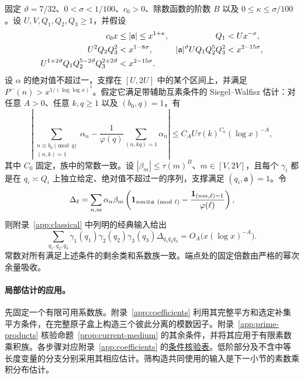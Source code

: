 \begin{proposition}[受限中等长度卷积]
\label{prop:current-medium}
固定 $\vartheta=7/32$、$0<\sigma<1/100$、$c_0>0$、除数函数的阶数 $B$ 以及 $0\le\kappa\le\sigma/100$。设 $U,V,Q_1,Q_2,Q_3\ge1$，并假设
\begin{align}
 c_0x&\le |\mathfrak a|\le x^{1+\kappa},&
 Q_1&<Ux^{-\sigma}, \notag\\
 U^2Q_2Q_3^2&<x^{1-8\sigma},&
 |\mathfrak a|^{\vartheta}UQ_1Q_2^5Q_3^2&<x^{2-15\sigma},
       \label{eq:current-medium-ranges}\\
 U^{1+2\vartheta}Q_1Q_2^{5-2\vartheta}Q_3^{2+2\vartheta}
      &<x^{2-15\sigma}.&&\notag
\end{align}
设 $\alpha$ 的绝对值不超过一，支撑在 $[U,2U]$ 中的某个区间上，并满足 $P^-(n)>x^{1/(\log\log x)^3}$。假定它满足带辅助互素条件的 Siegel--Walfisz 估计：对任意 $A>0$、任意 $k,q\ge1$ 以及 $(b_0,q)=1$，有
\begin{equation}
 \left|\sum_{\substack{n\equiv b_0\pmod q\\(n,k)=1}}\alpha_n
 -\frac1{\varphi(q)}\sum_{(n,kq)=1}\alpha_n\right|
 \le C_AU\tau(k)^{C_0}(\log x)^{-A},
 \label{eq:current-aux-sw}
\end{equation}
其中 $C_0$ 固定，族中的常数一致。设 $|\beta_m|\le\tau(m)^B$、$m\in[V,2V]$，且每个 $\gamma_i$ 都是在 $q_i\asymp Q_i$ 上独立给定、绝对值不超过一的序列，支撑满足 $(q_i,\mathfrak a)=1$。令
\[
 \Delta_{\ell}=\sum_{n,m}\alpha_n\beta_m
 \left({\mathbf 1}_{nm\equiv\mathfrak a\pmod \ell}
       -\frac{{\mathbf 1}_{(nm,\ell)=1}}{\varphi(\ell)}\right),
\]
则附录~\ref{app:classical} 中列明的经典输入给出
\begin{equation}
 \sum_{q_1,q_2,q_3}\gamma_1(q_1)\gamma_2(q_2)\gamma_3(q_3)
                    \Delta_{q_1q_2q_3}
       =O_A\bigl(x(\log x)^{-A}\bigr).
 \label{eq:current-medium-conclusion}
\end{equation}
常数对所有满足上述条件的剩余类和系数族一致。端点处的固定倍数由严格的幂次余量吸收。
\end{proposition}

\paragraph{局部估计的应用。}
先固定一个有限可用系数族。附录~\ref{app:coefficients} 利用其完整平方和选定补集平方条件，在完整原子盒上构造三个彼此分离的模数因子。附录~\ref{app:prime-products} 核验命题~\ref{prop:current-medium} 的其余条件，并将其应用于有限素数乘积族。各步骤对应附录~\ref{app:coefficients} 的\hyperlink{coef:medium-checks}{条件核验表}。低阶部分及不含中等长度变量的分支分别采用其相应估计。筛构造共同使用的输入是下一小节的素数乘积分布估计。

